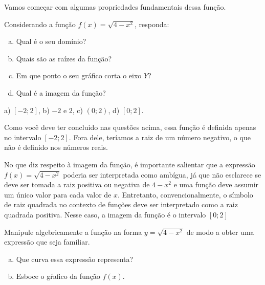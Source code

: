 \documentclass[main_estudante.tex]{subfiles}
\begin{document}
Vamos começar com algumas propriedades fundamentais dessa função.


\begin{questao}
Considerando a função $f(x)=\sqrt{4-x^2}$, responda:
\begin{enumerate}[a)]
\item Qual é o seu domínio?
\item Quais são as raízes da função?
\item Em que ponto o seu gráfico corta o eixo $Y$?
\item Qual é a imagem da função?
\end{enumerate}
\end{questao}

\begin{gabarito}
	\begin{gabaritoQuestao}
		a) $[-2;2]$, b) $-2$ e $2$, c) $(0;2)$, d) $[0;2]$.
	\end{gabaritoQuestao}
\end{gabarito}

Como você deve ter concluido nas questões acima, essa função é definida apenas no intervalo $[-2;2]$. Fora dele, teríamos a raiz de um número negativo, o que não é definido nos números reais.

No que diz respeito à imagem da função, é importante salientar que a expressão $f(x)=\sqrt{4-x^2}$ poderia ser interpretada como ambígua, já que não esclarece se deve ser tomada a raiz positiva ou negativa de $4-x^2$ e uma função deve assumir um único valor para cada valor de $x$. Entretanto, convencionalmente, o símbolo de raiz quadrada no contexto de funções deve ser interpretado como a raiz quadrada positiva. Nesse caso, a imagem da função é o intervalo $[0;2]$

\begin{questao}
Manipule algebricamente a função na forma $y=\sqrt{4-x^2}$ de modo a obter uma expressão que seja familiar. 
\begin{enumerate}[a)]
\item Que curva essa expressão representa?
\item Esboce o gŕafico da função $f(x)$.
\end{enumerate}
\end{questao}
\end{document}
